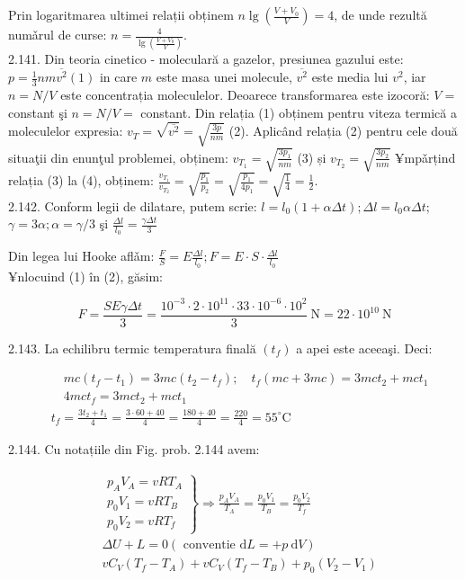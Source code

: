 Prin logaritmarea ultimei relații obținem $n \lg \left(\frac{V+V_{0}}{V}\right)=4$, de unde rezultă numǎrul de curse: $n=\frac{4}{\lg \left(\frac{V+V_{0}}{V}\right)}$.\\
2.141. Din teoria cinetico - moleculară a gazelor, presiunea gazului este: $p=\frac{1}{3} n m \overline{v^{2}}(1)$ in care $m$ este masa unei molecule, $\overline{v^{2}}$ este media lui $v^{2}$, iar $n=N / V$ este concentrația moleculelor. Deoarece transformarea este izocoră: $V=$ constant şi $n=N / V=$ constant. Din relația (1) obținem pentru viteza termică a moleculelor expresia: $v_{T}=\sqrt{\overline{v^{2}}}=\sqrt{\frac{3 p}{n m}}$ (2). Aplicând relația (2) pentru cele două situaţii din enunţul problemei, obținem: $v_{T_{1}}=\sqrt{\frac{3 p_{1}}{n m}}$ (3) și $v_{T_{2}}=\sqrt{\frac{3 p_{2}}{n m}}$ ¥mpǎrțind relația (3) la (4), obținem: $\frac{v_{T_{1}}}{v_{T_{2}}}=\sqrt{\frac{p_{1}}{p_{2}}}=\sqrt{\frac{p_{1}}{4 p_{1}}}=\sqrt{\frac{1}{4}}=\frac{1}{2}$.\\
2.142. Conform legii de dilatare, putem scrie: $l=l_{0}(1+\alpha \Delta t) ; \Delta l=l_{0} \alpha \Delta t$; $\gamma=3 \alpha ; \alpha=\gamma / 3$ şi $\frac{\Delta l}{l_{0}}=\frac{\gamma \Delta t}{3}$

Din legea lui Hooke aflǎm: $\frac{F}{S}=E \frac{\Delta l}{l_{0}} ; F=E \cdot S \cdot \frac{\Delta l}{l_{0}}$\\
¥nlocuind (1) în (2), găsim:

$$
F=\frac{S E \gamma \Delta t}{3}=\frac{10^{-3} \cdot 2 \cdot 10^{11} \cdot 33 \cdot 10^{-6} \cdot 10^{2}}{3} \mathrm{~N}=22 \cdot 10^{10} \mathrm{~N}
$$

2.143. La echilibru termic temperatura finală $\left(t_{f}\right)$ a apei este aceeaşi. Deci:

$$
\begin{aligned}
& \quad m c\left(t_{f}-t_{1}\right)=3 m c\left(t_{2}-t_{f}\right) ; \quad t_{f}(m c+3 m c)=3 m c t_{2}+m c t_{1} \\
& \quad 4 m c t_{f}=3 m c t_{2}+m c t_{1} \\
& t_{f}=\frac{3 t_{2}+t_{1}}{4}=\frac{3 \cdot 60+40}{4}=\frac{180+40}{4}=\frac{220}{4}=55^{\circ} \mathrm{C}
\end{aligned}
$$

2.144. Cu notațiile din Fig. prob. 2.144 avem:

$$
\begin{aligned}
& \left.\begin{array}{l}
p_{A} V_{A}=v R T_{A} \\
p_{0} V_{1}=v R T_{B} \\
p_{0} V_{2}=v R T_{f}
\end{array}\right\} \Rightarrow \frac{p_{A} V_{A}}{T_{A}}=\frac{p_{0} V_{1}}{T_{B}}=\frac{p_{0} V_{2}}{T_{f}} \\
& \Delta U+L=0(\text { conventie } \mathrm{d} L=+p \mathrm{~d} V) \\
& v C_{V}\left(T_{f}-T_{A}\right)+v C_{V}\left(T_{f}-T_{B}\right)+p_{0}\left(V_{2}-V_{1}\right)
\end{aligned}
$$

